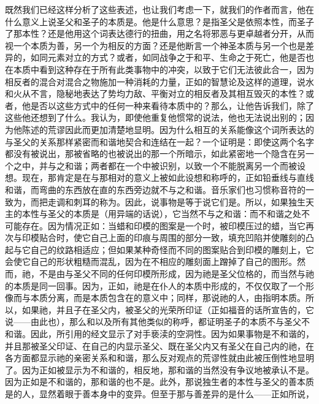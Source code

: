 既然我们已经这样分析了这些表述，也让我们考虑一下，就我们的作者而言，他在什么意义上说圣父和圣子的本质是。他是什么意思？是指圣父是依照本性，而圣子了那本性？还是他用这个词表达德行的扭曲，用之名将邪恶与更卓越者分开，从而视一个本质为善，另一个为相反的方面？还是他断言一个神圣本质与另一个也是差异的，如同元素对立的方式？或者，如同战争之于和平、生命之于死亡，他是否也在本质中看到这种存在于所有此类事物中的冲突，以致于它们无法彼此合一，因为相反者的混合对混合之物施加一种消耗的力量，正如的智慧论及这样的道理，说水和火从不言，隐秘地表达了势均力敌、平衡对立的相反者及其相互毁灭的本性？或者，他是否以这些方式中的任何一种来看待本质中的？那么，让他告诉我们，除了这些他还想到了什么。我认为，即使他重复他惯常的说法，他也无法说出别的；因为他陈述的荒谬因此而更加清楚地显明。因为什么相互的关系能像这个词所表达的与圣父的关系那样紧密而和谐地契合和连结在一起？一个证明是：即使这两个名字都没有被说出，那被省略的也被说出的那一个所暗示，如此紧密地一个隐含在另一个之中，并与之和谐；两者都在一个中被识别，以致一个不能脱离另一个而被设想。现在，那肯定是在与那相对的意义上被如此设想和称呼的，正如铅垂线与直线和谐，而弯曲的东西放在直的东西旁边就不与之和谐。音乐家们也习惯称音符的一致为，而把走调和刺耳的称为。因此，说事物是等于说它们是。所以，如果独生天主的本性与圣父的本质是（用异端的话说），它当然不与之和谐：而不和谐之处不可能存在。因为情况正如：当蜡和印模的图案是一个时，被印模压过的蜡，当它再次与印模贴合时，使它自己上面的印痕与周围的部分一致，填充凹陷并使雕刻的凸起与它自己的纹路相适应；但如果某种奇怪而不同的图案贴合到印模的雕刻上，它会使它自己的形状粗糙而混乱，因为在不相应的雕刻面上蹭掉了自己的图形。然而，祂，不是由与圣父不同的任何印模所形成，因为祂是圣父位格的，而当然与祂的本质是同一回事。因为，正如，祂是在仆人的本质中形成的，不仅仅取了一个形像而与本质分离，而是本质包含在的意义中；同样，那说祂的人，由指明本质。所以，如果祂，并且子在圣父内，被圣父的光荣所印证（正如福音的话所宣告的，它说——由此也），那么和以及所有其他类似的称呼，都证明圣子的本质不与圣父不和谐。因此，所引用的经文显示了对手亵渎的空洞性。因为如果事物是不和谐的，并且那被圣父印证、在自己的内显示圣父、既在圣父内又有圣父在自己内的祂，在各方面都显示祂的亲密关系和和谐，那么反对观点的荒谬性就由此被压倒性地显明了。因为正如被显示为不和谐的，相反地，那和谐的当然没有争议地被承认不是。因为正如是不和谐的，那和谐的也不是。此外，那说独生者的本性与圣父的善本质是的人，显然着眼于善本身中的变异。但至于那与善差异的是什么——正如所说，\par

